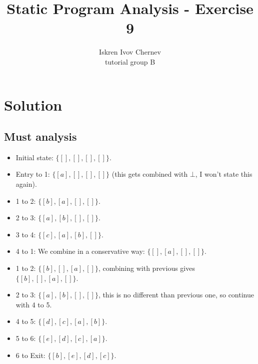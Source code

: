 \documentclass[a4paper]{article}
\begin{document}
\newcommand{\aee}[1] {[[#1]]^\sharp}
\newcommand{\cc}[1] {\texttt{#1}}
\newcommand{\s}[1] {\{#1\}}
\newcommand{\e}[1] {[#1]}
\def\A {\mathcal{A}}
\def\N {\mathcal{N}}
\def\Neg {\mathrm{Neg}}
\def\Pos {\mathrm{Pos}}
\def\Vars {\mathrm{Vars}}
\def\Occ {\mathrm{Occ}}
\def\PP {\mathrm{ProgramPoints}}

\title{Static Program Analysis - Exercise 9}
\author{Iskren Ivov Chernev \\ tutorial group B}

\maketitle

\section{Solution}

\subsection{Must analysis}

\begin{itemize}
  \item Initial state: $ \s{ \e{}, \e{}, \e{}, \e{} } $.
  \item Entry to 1: $ \s{ \e{a}, \e{}, \e{}, \e{} } $ (this gets combined with
        $ \bot $, I won't state this again).
  \item 1 to 2: $ \s{ \e{b}, \e{a}, \e{}, \e{} } $.
  \item 2 to 3: $ \s{ \e{a}, \e{b}, \e{}, \e{} } $.
  \item 3 to 4: $ \s{ \e{c}, \e{a}, \e{b}, \e{} } $.
  \item 4 to 1: We combine in a conservative way: $ \s{ \e{}, \e{a}, \e{}, \e{}
        } $.
  \item 1 to 2: $ \s{ \e{b}, \e{}, \e{a}, \e{} } $, combining with previous
        gives $ \s{ \e{b}, \e{}, \e{a}, \e{} } $.
  \item 2 to 3: $ \s{ \e{a}, \e{b}, \e{}, \e{} } $, this is no different than
        previous one, so continue with 4 to 5.
  \item 4 to 5: $ \s{ \e{d}, \e{c}, \e{a}, \e{b} } $.
  \item 5 to 6: $ \s{ \e{e}, \e{d}, \e{c}, \e{a} } $.
  \item 6 to Exit: $ \s{ \e{b}, \e{e}, \e{d}, \e{c} } $.

\end{itemize}
\end{document}
